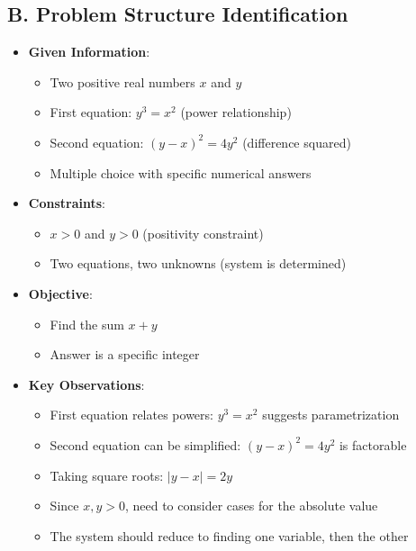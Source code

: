 \documentclass[12pt]{article}
\begin{document}
\begin{problemconfigbox}
\subsection*{B. Problem Structure Identification}
\begin{itemize}[leftmargin=*]
    \item \textbf{Given Information}: 
    \begin{itemize}
        \item Two positive real numbers $x$ and $y$
        \item First equation: $y^3 = x^2$ (power relationship)
        \item Second equation: $(y-x)^2 = 4y^2$ (difference squared)
        \item Multiple choice with specific numerical answers
    \end{itemize}
    \item \textbf{Constraints}: 
    \begin{itemize}
        \item $x > 0$ and $y > 0$ (positivity constraint)
        \item Two equations, two unknowns (system is determined)
    \end{itemize}
    \item \textbf{Objective}: 
    \begin{itemize}
        \item Find the sum $x+y$
        \item Answer is a specific integer
    \end{itemize}
    \item \textbf{Key Observations}: 
    \begin{itemize}
        \item First equation relates powers: $y^3 = x^2$ suggests parametrization
        \item Second equation can be simplified: $(y-x)^2 = 4y^2$ is factorable
        \item Taking square roots: $|y-x| = 2y$
        \item Since $x,y > 0$, need to consider cases for the absolute value
        \item The system should reduce to finding one variable, then the other
    \end{itemize}
\end{itemize}


\end{problemconfigbox}
\end{document}
